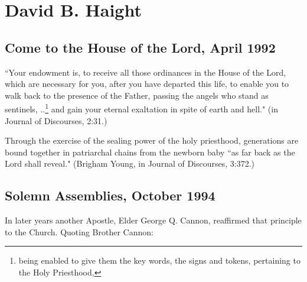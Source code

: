 \section{David B. Haight}

\subsection{Come to the House of the Lord, April 1992}

``Your endowment is, to receive all those ordinances in the House of the Lord, which are necessary for you, after you have departed this life, to enable you to walk back to the presence of the Father, passing the angels who stand as sentinels, ..\footnote{being enabled to give them the key words, the signs and tokens, pertaining to the Holy Priesthood,} and gain your eternal exaltation in spite of earth and hell." (in Journal of Discourses, 2:31.)

Through the exercise of the sealing power of the holy priesthood, generations are bound together in patriarchal chains from the newborn baby ``as far back as the Lord shall reveal." (Brigham Young, in Journal of Discourses, 3:372.)

\subsection{Solemn Assemblies, October 1994}

In later years another Apostle, Elder George Q. Cannon, reaffirmed that principle to the Church. Quoting Brother Cannon:

